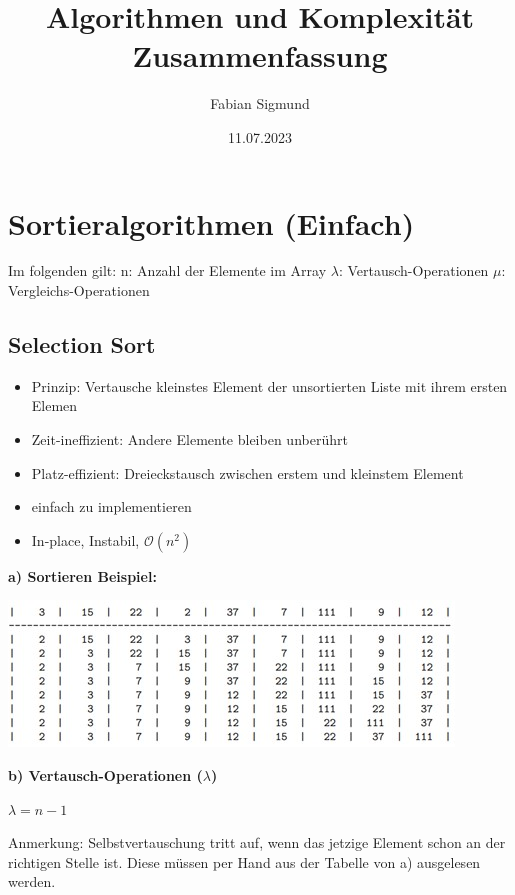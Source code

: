 \documentclass[12pt]{article}
\title{Algorithmen und Komplexität Zusammenfassung}
\author{Fabian Sigmund}
\date{11.07.2023}
\begin{document}
	\maketitle
	\pagebreak
	\tableofcontents
	\pagebreak
	\section{Sortieralgorithmen (Einfach)}
	
	Im folgenden gilt:
	\newline
	n: Anzahl der Elemente im Array\newline
	$\lambda$: Vertausch-Operationen \newline
	$\mu$: Vergleichs-Operationen
	
	\subsection{Selection Sort}
	
	\begin{itemize}
		\item Prinzip: Vertausche kleinstes Element der unsortierten Liste mit ihrem ersten Elemen
		\item Zeit-ineffizient: Andere Elemente bleiben unberührt
		\item Platz-effizient: Dreieckstausch zwischen erstem und kleinstem Element
		\item einfach zu implementieren
		\item In-place, Instabil, $ \mathcal{O}(n^2) $ 
	\end{itemize}
	
	\textbf{a) Sortieren Beispiel:}
	
	\includegraphics{SelectionSort}
	\break
	
	\textbf{b) Vertausch-Operationen ($\lambda$)} \hfill \break
	
	\begin{center}
		$\lambda = n - 1$
	\end{center}
	
	Anmerkung: Selbstvertauschung tritt auf, wenn das jetzige Element schon an der richtigen Stelle ist. Diese müssen per Hand aus der Tabelle von a) ausgelesen werden.
\end{document}
